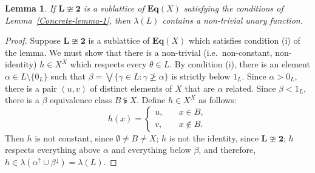 \documentclass[cm,dissertation]{uhthesis}
\theoremstyle{plain}
\newtheorem{lemma}[theorem]{Lemma}
\theoremstyle{definition}
\theoremstyle{remark}
\numberwithin{theorem}{section}
\numberwithin{claim}{chapter}
\numberwithin{equation}{section}
\numberwithin{conjecture}{chapter}
\newcommand{\<}{\ensuremath{\langle}}
\renewcommand{\>}{\ensuremath{\rangle}}
\renewcommand{\ngeq}{\ensuremath{\ngeqslant}}
\newcommand{\bEqX}{\ensuremath{\mathbf{Eq}(X)}}
\newcommand{\0}{\ensuremath{\mathbf{0}}}
\newcommand{\1}{\ensuremath{\mathbf{1}}}
\newcommand{\2}{\ensuremath{\mathbf{2}}}
\newcommand{\3}{\ensuremath{\mathbf{3}}}
\newcommand{\4}{\ensuremath{\mathbf{4}}}
\newcommand{\5}{\ensuremath{\mathbf{5}}}
\newcommand{\bL}{\ensuremath{\mathbf{L}}}
\newcommand{\upalpha}{\ensuremath{\alpha^{\uparrow}}}
\newcommand{\downbeta}{\ensuremath{\beta^{\downarrow}}}
\begin{document}
\begin{lemma} 
\label{Concrete-lemma-2} 
If $\bL\ncong \mathbf{2}$ is a sublattice of $\bEqX$ satisfying the
conditions of Lemma~\ref{Concrete-lemma-1}, then $\lambda(L)$ contains a non-trivial unary function.
\end{lemma}
\begin{proof}
Suppose $\bL\ncong \mathbf{2}$ is a sublattice of $\bEqX$ which satisfies condition (i)
of the lemma.  We must show that there is a non-trivial (i.e.~non-constant, non-identity)
$h\in X^X$ which respects every $\theta \in L$.  
By condition (i), there is an element $\alpha \in L \setminus \{0_L\}$ such that $\beta =
\bigvee\{\gamma\in L: \gamma \ngeq \alpha \}$ is strictly below $1_L$. Since 
$\alpha > 0_L$, there is a pair $(u,v)$ of distinct elements of $X$ that are
$\alpha$ related.  Since $\beta < 1_L$, there is a $\beta$ equivalence class 
$B \subsetneqq X$.  Define $h\in X^X$ as follows:
\begin{equation}
  \label{eq:h}
h(x) = \begin{cases}
u,& \quad x\in B,\\
v,& \quad x\notin B.
\end{cases}
\end{equation}
Then $h$ is not constant, since $\emptyset \neq B \neq X$;
$h$ is not the identity, since $\bL\ncong \mathbf{2}$; $h$
respects everything above $\alpha$ and everything below $\beta$, and therefore, $h\in
\lambda(\upalpha \cup \downbeta) = \lambda(L)$.
\end{proof}
\end{document}
